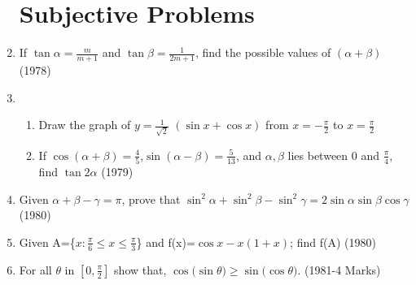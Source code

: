 \documentclass[journal,12pt,twocolumn]{IEEEtran}
\theoremstyle{remark}
\begin{document}
\begin{enumerate}
\section{Subjective Problems}
\item If $\tan{\alpha}=\frac{m}{m+1}$ and $\tan{\beta}=\frac{1}{2m+1}$, find the possible values of $(\alpha+\beta)$ \hfill(1978)
\item 
\begin{enumerate}
    \item Draw the graph of $y=\frac{1}{\sqrt{2}}$ $(\sin {x}+\cos {x})$ from $x=-\frac{\pi}{2}$ to $x=\frac{\pi}{2}$
    \item If $\cos{(\alpha+\beta)}=\frac{4}{5}$,$\sin{(\alpha-\beta)}=\frac{5}{13}$, and $\alpha,\beta$ lies between 0 and $\frac{\pi}{4}$, find $\tan{2\alpha}$ \hfill(1979)
\end{enumerate}
\item Given $\alpha+\beta-\gamma=\pi$, prove that $\sin^2{\alpha}+\sin^2{\beta}-\sin^2{\gamma}=2\sin{\alpha}\sin{\beta}\cos{\gamma}$ \hfill(1980)
\item Given A=\{$x:\frac{\pi}{6}\le x\le\frac{\pi}{3}$\} and f(x)=$\cos{x-x(1+x)}$; find f(A) \hfill(1980)

\item For all $\theta$ in $\left[0, \frac{\pi}{2}\right]$ show that, $\cos{(\sin{\theta)}}\geq
\sin{(\cos{\theta)}}.$ \hfill(1981-4 Marks)

\end{enumerate}
\end{document}
